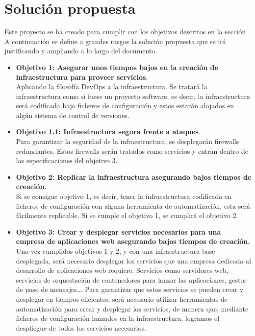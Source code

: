 \section{Solución propuesta}
\begin{text}
	Este proyecto se ha creado para cumplir con los objetivos descritos en la sección . A continuación se define a grandes rasgos la solución propuesta que se irá justificando y ampliando a lo largo del documento. \\
	\begin{itemize}
		\item \textbf{Objetivo 1: Asegurar unos tiempos bajos en la creación de infraestructura para proveer servicios}. \\ Aplicando la filosofía DevOps a la infraestructura. Se tratará la infraestructura como si fuese un proyecto software, es decir, la infraestructura será codificada bajo ficheros de configuración y estos estarán alojados en algún sistema de control de versiones.
		\item \textbf{Objetivo 1.1: Infraestructura segura frente a ataques}. \\ Para garantizar la seguridad de la infraestructura, se desplegarán firewalls redundantes. Estos firewalls serán tratados como servicios y entran dentro de las especificaciones del objetivo 3.
		\item \textbf{Objetivo 2: Replicar la infraestructura asegurando bajos tiempos de creación.} \\
		Si se consigue objetivo 1, es decir, tener la infraestructura codificada en ficheros de configuración con alguna herramienta de automatización, esta será fácilmente replicable. Si se cumple el objetivo 1, se cumplirá el objetivo 2.
		\item \textbf{Objetivo 3: Crear y desplegar servicios necesarios para una empresa de aplicaciones web asegurando bajos tiempos de creación.} \\
		Una vez cumplidos objetivos 1 y 2, y con una infraestructura base desplegada, será necesario desplegar los servicios que una empresa dedicada al desarrollo de aplicaciones web requiere. Servicios como servidores web, servicios de orquestación de contenedores para lanzar las aplicaciones, gestor de paso de mensajes... Para garantizar que estos servicios se pueden crear y desplegar en tiempos eficientes, será necesario utilizar herramientas de automatización para crear y desplegar los servicios, de manera que, mediante ficheros de configuración lanzados en la infraestructura, logramos el despliegue de todos los servicios necesarios.

\end{itemize}
\end{text}
